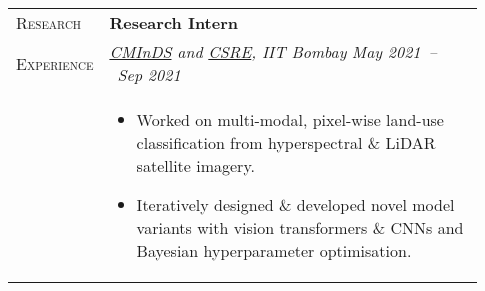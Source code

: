 \documentclass[letterpaper, 10pt, oneside]{article}
\newcommand{\stitle}[1]{\normalsize{\textsc{#1}}}
\newcommand{\bdit}[1]{{\textbf{#1}}}
\begin{document}
\begin{longtable}{@{} p{0.13\linewidth} p{0.8\linewidth}}
    \stitle{Research}    & \bdit{Research Intern}                                                                                                                                                                               \\
    \stitle{Experience}  & \textsl{\href{http://www.minds.iitb.ac.in/}{CMInDS} and \href{https://www.csre.iitb.ac.in/}{CSRE}, IIT Bombay} \hfill \textsl{May 2021\ --\ Sep 2021}                                                \\
                         & \parbox{0.8\textwidth}{                                                                                                                                                                              %
        \begin{itemize}[leftmargin=*, itemsep=-0.88ex, topsep=-0.88ex]
            \item Worked on multi-modal, pixel-wise land-use classification from hyperspectral \& LiDAR satellite imagery.
            \item Iteratively designed \& developed novel model variants with vision transformers \& CNNs and Bayesian hyperparameter optimisation.
        \end{itemize}
    }
    \\
    \\


\end{longtable}
\end{document}
